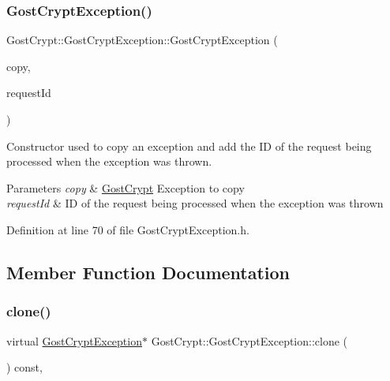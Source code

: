 \subsubsection{\texorpdfstring{Gost\+Crypt\+Exception()}{GostCryptException()}\hspace{0.1cm}{\footnotesize\ttfamily [3/3]}}
{\footnotesize\ttfamily Gost\+Crypt\+::\+Gost\+Crypt\+Exception\+::\+Gost\+Crypt\+Exception (\begin{DoxyParamCaption}\item[{const \hyperlink{class_gost_crypt_1_1_gost_crypt_exception}{Gost\+Crypt\+Exception} \&}]{copy,  }\item[{quint32}]{request\+Id }\end{DoxyParamCaption})\hspace{0.3cm}{\ttfamily [inline]}}



Constructor used to copy an exception and add the ID of the request being processed when the exception was thrown. 


\begin{DoxyParams}{Parameters}
{\em copy} & \hyperlink{namespace_gost_crypt}{Gost\+Crypt} Exception to copy \\
\hline
{\em request\+Id} & ID of the request being processed when the exception was thrown \\
\hline
\end{DoxyParams}


Definition at line 70 of file Gost\+Crypt\+Exception.\+h.



\subsection{Member Function Documentation}
\mbox{\label{class_gost_crypt_1_1_gost_crypt_exception_aba2219d4a03ed5447540ba75e6deda88}} 
\subsubsection{\texorpdfstring{clone()}{clone()}\hspace{0.1cm}{\footnotesize\ttfamily [1/2]}}
{\footnotesize\ttfamily virtual \hyperlink{class_gost_crypt_1_1_gost_crypt_exception}{Gost\+Crypt\+Exception}$\ast$ Gost\+Crypt\+::\+Gost\+Crypt\+Exception\+::clone (\begin{DoxyParamCaption}{ }\end{DoxyParamCaption}) const\hspace{0.3cm}{\ttfamily [inline]}, {\ttfamily [virtual]}}



